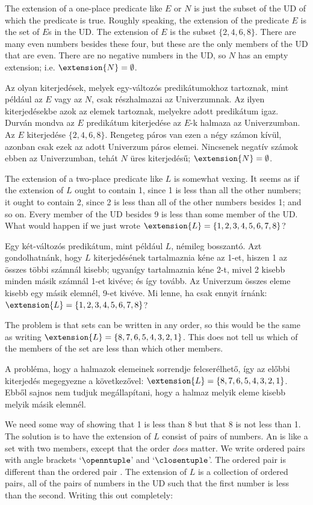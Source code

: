 The extension of a one-place predicate like $E$ or $N$ is just the subset of the UD of which the predicate is true. Roughly speaking, the extension of the predicate $E$ is the set of $E$s in the UD.
The extension of $E$ is the subset $\{2,4,6,8\}$. There are many even numbers besides these four, but these are the only members of the UD that are even. There are no negative numbers in the UD, so $N$ has an empty extension; i.e. $\extension{N}=\emptyset$.

Az olyan kiterjedések, melyek egy-változós predikátumokhoz tartoznak, mint például az $E$ vagy az $N$, csak részhalmazai az Univerzumnak. Az ilyen kiterjedésekbe azok az elemek tartoznak, melyekre adott predikátum igaz. Durván mondva az $E$ predikátum kiterjedése az $E$-k halmaza az Univerzumban. Az $E$ kiterjedése $\{2,4,6,8\}$. Rengeteg páros van ezen a négy számon kívül, azonban csak ezek az adott Univerzum páros elemei. Nincsenek negatív számok ebben az Univerzumban, tehát $N$ üres kiterjedésű; $\extension{N}=\emptyset$.

The extension of a two-place predicate like $L$ is somewhat vexing. It seems as if the extension of $L$ ought to contain 1, since 1 is less than all the other numbers; it ought to contain 2, since 2 is less than all of the other numbers besides 1; and so on. Every member of the UD besides 9 is less than some member of the UD. What would happen if we just wrote $\extension{L}=\{1,2,3,4,5,6,7,8\}$?

Egy két-változós predikátum, mint például $L$, némileg bosszantó. Azt gondolhatnánk, hogy $L$ kiterjedésének tartalmaznia kéne az 1-et, hiszen 1 az összes többi számnál kisebb; ugyanígy tartalmaznia kéne 2-t, mivel 2 kisebb minden másik számnál 1-et kivéve; és így tovább. Az Univerzum összes eleme kisebb egy másik elemnél, 9-et kivéve. Mi lenne, ha csak ennyit írnánk: $\extension{L}=\{1,2,3,4,5,6,7,8\}$?

The problem is that sets can be written in any order, so this would be the same as writing $\extension{L}=\{8,7,6,5,4,3,2,1\}$. This does not tell us which of the members of the set are less than which other members.

A probléma, hogy a halmazok elemeinek sorrendje felcserélhető, így az előbbi kiterjedés megegyezne a következővel: $\extension{L}=\{8,7,6,5,4,3,2,1\}$. Ebből sajnos nem tudjuk megállapítani, hogy a halmaz melyik eleme kisebb melyik másik elemnél.

We need some way of showing that 1 is less than 8 but that 8 is not less than 1. The solution is to have the extension of $L$ consist of pairs of numbers. An  is like a set with two members, except that the order \emph{does} matter. We write ordered pairs with angle brackets `$\openntuple$' and `$\closentuple$'. The ordered pair \mbox{} is different than the ordered pair \mbox{}. The extension of $L$ is a collection of ordered pairs, all of the pairs of numbers in the UD such that the first number is less than the second. Writing this out completely:

